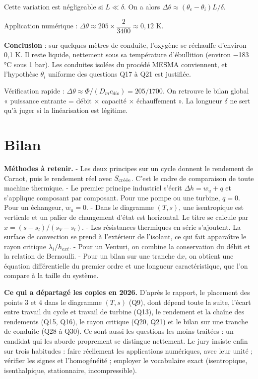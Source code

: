 \documentclass[11pt,a4paper]{article}
\begin{document}
Cette variation est négligeable si \(L\ll\delta\). On a alors \(\Delta\theta\approx(\theta_e-\theta_i)L/\delta\).

Application numérique : \(\Delta\theta\approx205\times\dfrac{2}{3400}\approx0{,}12\) K.

\textbf{Conclusion} : sur quelques mètres de conduite, l'oxygène se réchauffe d'environ 0,1 K. Il reste liquide, nettement sous sa température d'ébullition (environ −183 °C sous 1 bar). Les conduites isolées du procédé MESMA conviennent, et l'hypothèse \(\theta_i\) uniforme des questions Q17 à Q21 est justifiée.

\begin{methode}

Vérification rapide : \(\Delta\theta\approx\Phi/(D_mc_{dio})=205/1700\). On retrouve le bilan global « puissance entrante = débit × capacité × échauffement ». La longueur \(\delta\) ne sert qu'à juger si la linéarisation est légitime.

\end{methode}

\hypertarget{bilan}{%
\section{Bilan}\label{bilan}}

\textbf{Méthodes à retenir.}
- Les deux principes sur un cycle donnent le rendement de Carnot, puis le rendement réel avec \(S_{\text{\text{créée}}}\). C'est le cadre de comparaison de toute machine thermique.
- Le premier principe industriel s'écrit \(\Delta h=w_u+q\) et s'applique composant par composant. Pour une pompe ou une turbine, \(q=0\). Pour un échangeur, \(w_u=0\).
- Dans le diagramme \((T,s)\), une isentropique est verticale et un palier de changement d'état est horizontal. Le titre se calcule par \(x=(s-s_l)/(s_V-s_l)\).
- Les résistances thermiques en série s'ajoutent. La surface de convection se prend à l'extérieur de l'isolant, ce qui fait apparaître le rayon critique \(\lambda_i/h_{ext}\).
- Pour un Venturi, on combine la conservation du débit et la relation de Bernoulli.
- Pour un bilan sur une tranche \(\mathrm{d}x\), on obtient une équation différentielle du premier ordre et une longueur caractéristique, que l'on compare à la taille du système.

\textbf{Ce qui a départagé les copies en 2026.} D'après le rapport, le placement des points 3 et 4 dans le diagramme \((T,s)\) (Q9), dont dépend toute la suite, l'écart entre travail du cycle et travail de turbine (Q13), le rendement et la chaîne des rendements (Q15, Q16), le rayon critique (Q20, Q21) et le bilan sur une tranche de conduite (Q28 à Q30). Ce sont aussi les questions les moins traitées : un candidat qui les aborde proprement se distingue nettement. Le jury insiste enfin sur trois habitudes : faire réellement les applications numériques, avec leur unité ; vérifier les signes et l'homogénéité ; employer le vocabulaire exact (isentropique, isenthalpique, stationnaire, incompressible).
\end{document}
